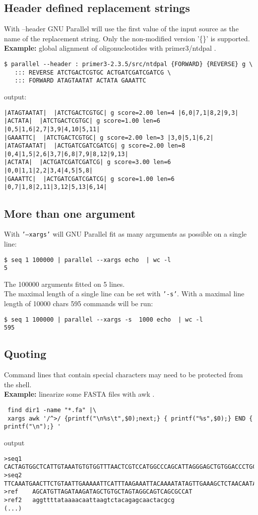 \documentclass{article}
\newcommand{\example}[1]{
\textbf{Example: } {\color[rgb]{0,0,1} #1 } .
}
\begin{document}
\subsection{Header defined replacement strings}
With --header GNU Parallel will use the first value of the input source as the name of the replacement string. Only the non-modified version '\{\}' is supported.\\
\example{global alignment of oligonucleotides with primer3/ntdpal}
\begin{lstlisting}
$ parallel --header : primer3-2.3.5/src/ntdpal {FORWARD} {REVERSE} g \
   ::: REVERSE ATCTGACTCGTGC ACTGATCGATCGATCG \
   ::: FORWARD ATAGTAATAT ACTATA GAAATTC
\end{lstlisting}
output:
\begin{lstlisting}
|ATAGTAATAT|  |ATCTGACTCGTGC| g score=2.00 len=4 |6,0|7,1|8,2|9,3|
|ACTATA|  |ATCTGACTCGTGC| g score=1.00 len=6 |0,5|1,6|2,7|3,9|4,10|5,11|
|GAAATTC|  |ATCTGACTCGTGC| g score=2.00 len=3 |3,0|5,1|6,2|
|ATAGTAATAT|  |ACTGATCGATCGATCG| g score=2.00 len=8 |0,4|1,5|2,6|3,7|6,8|7,9|8,12|9,13|
|ACTATA|  |ACTGATCGATCGATCG| g score=3.00 len=6 |0,0|1,1|2,2|3,4|4,5|5,8|
|GAAATTC|  |ACTGATCGATCGATCG| g score=1.00 len=6 |0,7|1,8|2,11|3,12|5,13|6,14|
\end{lstlisting}

\subsection{More than one argument}
With \texttt{'--xargs'} will GNU Parallel fit as many arguments as possible on a single line:
\begin{lstlisting}
$ seq 1 100000 | parallel --xargs echo  | wc -l
5
\end{lstlisting}
The 100000 arguments fitted on 5 lines.\\

The maximal length of a single line can be set with \texttt{'-s'}. With a maximal line length of 10000 chars 595 commands will be run:
\begin{lstlisting}
$ seq 1 100000 | parallel --xargs -s  1000 echo  | wc -l
595
\end{lstlisting}

\subsection{Quoting}
Command lines that contain special characters may need to be protected from the shell.\\
\example{linearize some FASTA files with awk}
\begin{lstlisting}
 find dir1 -name "*.fa" |\
 xargs awk '/^>/ {printf("\n%s\t",$0);next;} { printf("%s",$0);} END { printf("\n");} '
\end{lstlisting}
output
\begin{lstlisting}
>seq1	CACTAGTGGCTCATTGTAAATGTGTGGTTTAACTCGTCCATGGCCCAGCATTAGGGAGCTGTGGACCCTGCAGCCTGGCTGTGGGGGCCGCAGT
>seq2	TTCAAATGAACTTCTGTAATTGAAAAATTCATTTAAGAAATTACAAAATATAGTTGAAAGCTCTAACAATAGACTAAACCAAGCAGAAGAAAGA
>ref	AGCATGTTAGATAAGATAGCTGTGCTAGTAGGCAGTCAGCGCCAT
>ref2	aggttttataaaacaattaagtctacagagcaactacgcg
(...)
\end{lstlisting}
\end{document}
